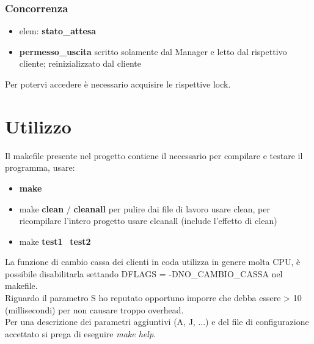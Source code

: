 \documentclass[11pt, a4paper]{article}
\begin{document}
\subsubsection{Concorrenza}
\begin{itemize}
\item elem: \textbf{stato\_attesa}
\item \textbf{permesso\_uscita} scritto solamente dal Manager e letto dal rispettivo cliente; reinizializzato dal cliente\\
\end{itemize}
Per potervi accedere è necessario acquisire le rispettive lock.
\section{Utilizzo}
Il makefile presente nel progetto contiene il necessario per compilare e testare il programma, usare:
\begin{itemize}
\item \textbf{make}
\item make \textbf{clean} / \textbf{cleanall} per pulire dai file di lavoro usare clean, per ricompilare l'intero progetto usare cleanall (include l'effetto di clean)
\item make \textbf{test1} \ \textbf{test2}
\end{itemize}
La funzione di cambio cassa dei clienti in coda utilizza in genere molta CPU, è possibile disabilitarla settando DFLAGS = -DNO\_CAMBIO\_CASSA nel makefile.\\
Riguardo il parametro S ho reputato opportuno imporre che debba essere > 10 (millisecondi) per non causare troppo overhead.\\
Per una descrizione dei parametri aggiuntivi (A, J, ...) e del file di configurazione accettato si prega di eseguire \textit{make help}.
\end{document}
